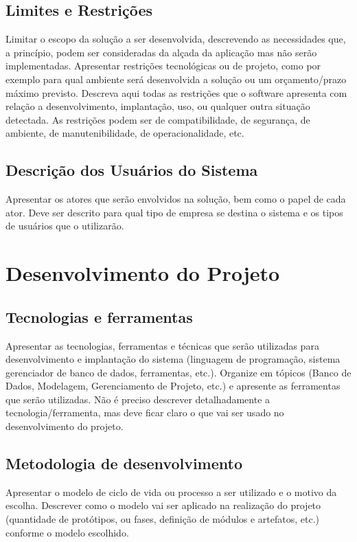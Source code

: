 \documentclass[a4paper,12pt]{article}
\begin{document}
\subsection{Limites e Restrições}
Limitar o escopo da solução a ser desenvolvida, descrevendo as necessidades que, a princípio, podem ser consideradas da alçada da aplicação mas não serão implementadas. Apresentar restrições tecnológicas ou de projeto, como por exemplo para qual ambiente será desenvolvida a solução ou um orçamento/prazo máximo previsto. Descreva aqui todas as restrições que o software apresenta com relação a desenvolvimento, implantação, uso, ou qualquer outra situação detectada. As restrições podem ser de compatibilidade, de segurança, de ambiente, de manutenibilidade, de operacionalidade, etc.

\subsection{Descrição dos Usuários do Sistema}
Apresentar os atores que serão envolvidos na solução, bem como o papel de cada ator. Deve ser descrito para qual tipo de empresa se destina o sistema e os tipos de usuários que o utilizarão.

\newpage
\section{Desenvolvimento do Projeto}
\subsection{Tecnologias e ferramentas}

Apresentar as tecnologias, ferramentas e técnicas que serão utilizadas para desenvolvimento e implantação do sistema (linguagem de programação, sistema gerenciador de banco de dados, ferramentas, etc.). Organize em tópicos (Banco de Dados, Modelagem, Gerenciamento de Projeto, etc.) e apresente as ferramentas que serão utilizadas. Não é preciso descrever detalhadamente a tecnologia/ferramenta, mas deve ficar claro o que vai ser usado no desenvolvimento do projeto.

\subsection{Metodologia de desenvolvimento}
Apresentar o modelo de ciclo de vida ou processo a ser utilizado e o motivo da escolha. Descrever como o modelo vai ser aplicado na realização do projeto (quantidade de protótipos, ou fases, definição de módulos e artefatos, etc.) conforme o modelo escolhido.
\end{document}
